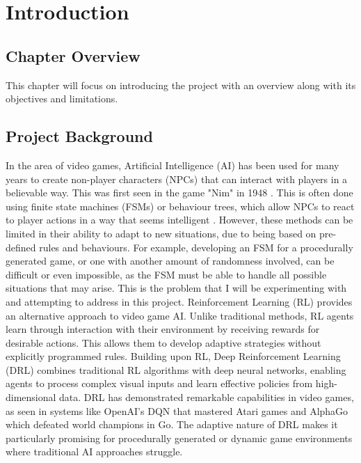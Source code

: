 \chapter{Introduction}

\section{Chapter Overview}
This chapter will focus on introducing the project with an overview along with its objectives and limitations.

\section{Project Background}
In the area of video games, Artificial Intelligence (AI) has been used for many years to create non-player characters (NPCs) that can interact with players in a believable way. This was first seen in the game "Nim" in 1948 \cite{wiki_ai_games}. 
This is often done using finite state machines (FSMs) or behaviour trees, which allow NPCs to react to player actions in a way that seems intelligent \cite{simulacrum}.
However, these methods can be limited in their ability to adapt to new situations, due to being based on pre-defined rules and behaviours. 
For example, developing an FSM for a procedurally generated game, or one with another amount of randomness involved, can be difficult or even impossible, as the FSM must be able to handle all possible situations that may arise.
This is the problem that I will be experimenting with and attempting to address in this project.
Reinforcement Learning (RL) provides an alternative approach to video game AI. 
Unlike traditional methods, RL agents learn through interaction with their environment by receiving rewards for desirable actions. 
This allows them to develop adaptive strategies without explicitly programmed rules.
Building upon RL, Deep Reinforcement Learning (DRL) combines traditional RL algorithms with deep neural networks, enabling agents to process complex visual inputs and learn effective policies from high-dimensional data. 
DRL has demonstrated remarkable capabilities in video games, as seen in systems like OpenAI's DQN that mastered Atari games and AlphaGo which defeated world champions in Go. 
The adaptive nature of DRL makes it particularly promising for procedurally generated or dynamic game environments where traditional AI approaches struggle.


